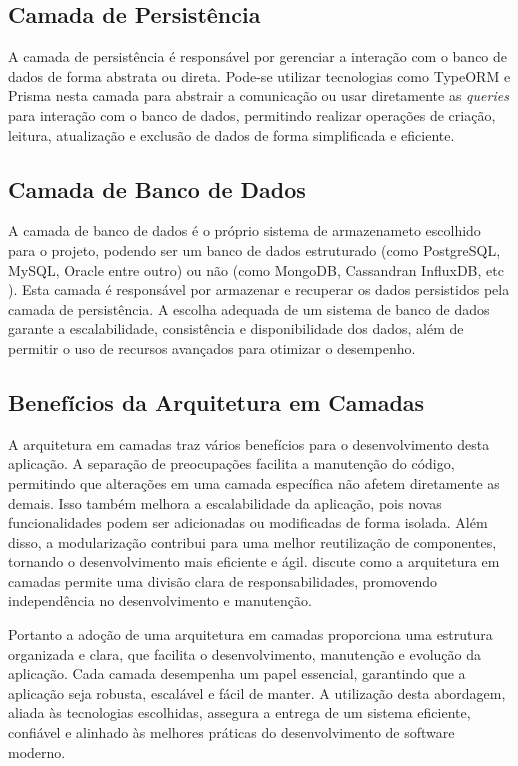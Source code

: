 \subsection{Camada de Persistência}

A camada de persistência é responsável por gerenciar a interação com o banco de dados de forma abstrata ou direta. Pode-se utilizar tecnologias como TypeORM e Prisma nesta camada para abstrair a comunicação ou usar diretamente as \textit{queries} para interação com o banco de dados, permitindo realizar operações de criação, leitura, atualização e exclusão de dados de forma simplificada e eficiente.

\subsection{Camada de Banco de Dados}\label{subsec:camada_banco_de_dados}

A camada de banco de dados é o próprio sistema de armazenameto escolhido para o projeto, podendo ser um banco de dados estruturado (como PostgreSQL, MySQL, Oracle entre outro) ou não (como MongoDB, Cassandran InfluxDB, etc ). Esta camada é responsável por armazenar e recuperar os dados persistidos pela camada de persistência. A escolha adequada de um sistema de banco de dados garante a escalabilidade, consistência e disponibilidade dos dados, além de permitir o uso de recursos avançados para otimizar o desempenho.

\subsection{Benefícios da Arquitetura em Camadas}

A arquitetura em camadas traz vários benefícios para o desenvolvimento desta aplicação. A separação de preocupações facilita a manutenção do código, permitindo que alterações em uma camada específica não afetem diretamente as demais. Isso também melhora a escalabilidade da aplicação, pois novas funcionalidades podem ser adicionadas ou modificadas de forma isolada. Além disso, a modularização contribui para uma melhor reutilização de componentes, tornando o desenvolvimento mais eficiente e ágil. \cite{Martin17} discute como a arquitetura em camadas permite uma divisão clara de responsabilidades, promovendo independência no desenvolvimento e manutenção.

Portanto a adoção de uma arquitetura em camadas proporciona uma estrutura organizada e clara, que facilita o desenvolvimento, manutenção e evolução da aplicação. Cada camada desempenha um papel essencial, garantindo que a aplicação seja robusta, escalável e fácil de manter. A utilização desta abordagem, aliada às tecnologias escolhidas, assegura a entrega de um sistema eficiente, confiável e alinhado às melhores práticas do desenvolvimento de software moderno.


